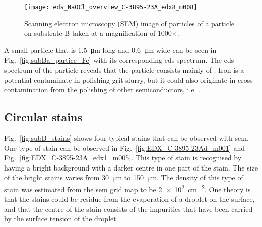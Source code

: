 \begin{figure}
    \centering
    \texttt{[image: eds\_NaOCl\_overview\_C-3895-23A\_edx8\_m008]}
    \caption{Scanning electron microscopy (SEM) image of particles of a particle on substrate B taken at a magnification of 1000$\times$.}
    \label{fig:eds_NaOCl_overview}
\end{figure}

A small particle that is \SI{1.5}{\micro\metre} long and \SI{0.6}{\micro\metre} wide can be seen in Fig.~\ref{fig:subBa_partice_Fe} with its corresponding \ac{eds} spectrum. The \ac{eds} spectrum of the particle reveals that the particle consists mainly of . Iron is a potential contaminate in polishing grit slurry, but it could also originate in cross-contamination from the polishing of other semiconductors, i.e.  \citep{benson2015as-received}.

\subsection{Circular stains}
Fig.~\ref{fig:subB_stains} shows four typical stains that can be observed with \ac{sem}. One type of stain can be observed in Fig.~\ref{fig:EDX_C-3895-23Ad_m001} and Fig.~\ref{fig:EDX_C-3895-23A_edx1_m005}. This type of stain is recognised by having a bright background with a darker centre in one part of the stain. The size of the bright stains varies from \SI{30}{\micro\metre} to \SI{150}{\micro\metre}. The density of this type of stain was estimated from the \ac{sem} grid map to be \SI{2e2}{\centi\metre^{-2}}. One theory  is that the stains could be residue from the evaporation of a droplet on the surface, and that the centre of the stain consists of the impurities that have been carried by the surface tension of the droplet. 

